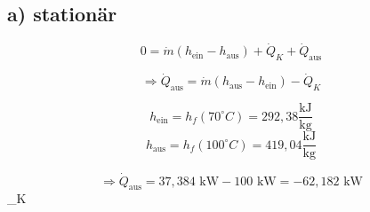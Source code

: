 \subsection*{a) stationär}

\[
0 = \dot{m} (h_{\text{ein}} - h_{\text{aus}}) + \dot{Q}_K + \dot{Q}_{\text{aus}}
\]

\[
\Rightarrow \dot{Q}_{\text{aus}} = \dot{m} (h_{\text{aus}} - h_{\text{ein}}) - \dot{Q}_K
\]

\[
h_{\text{ein}} = h_f (70^\circ C) = 292,38 \frac{\text{kJ}}{\text{kg}}
\]
\[
h_{\text{aus}} = h_f (100^\circ C) = 419,04 \frac{\text{kJ}}{\text{kg}}
\]

\[
\Rightarrow \dot{Q}_{\text{aus}} = 37,384 \text{ kW} - 100 \text{ kW} = -62,182 \text{ kW}
\]
 _K 